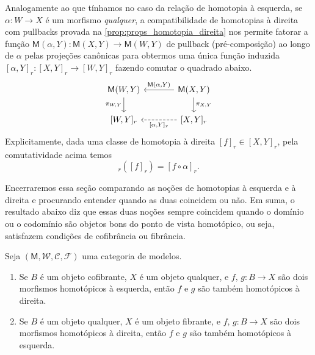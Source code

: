 Analogamente ao que tínhamos no caso da relação de homotopia à esquerda, se $\alpha: W \to X$ é um morfismo \emph{qualquer}, a compatibilidade de homotopias à direita com pullbacks provada na \cref{prop:props_homotopia_direita} nos permite fatorar a função $\mathsf{M}(\alpha,Y): \mathsf{M}(X,Y) \to \mathsf{M}(W,Y)$ de pullback (pré-composição) ao longo de $\alpha$ pelas projeções canônicas para obtermos uma única função induzida $[\alpha,Y]_{r}: [X,Y]_{r} \to [W,Y]_{r}$ fazendo comutar o quadrado abaixo.
\begin{displaymath}
  \begin{tikzcd}[column sep=1.25cm]
    \mathsf{M}(W,Y)
    \arrow[d, "{\pi_{W,Y}}" swap]
    & \mathsf{M}(X,Y)
    \arrow[d, "{\pi_{X,Y}}"]
    \arrow[l, "{\mathsf{M}(\alpha,Y)}" swap]
    \\ {[W,Y]_{r}}
    & {[X,Y]_{r}}
    \arrow[l, dashed, "{[\alpha,Y]_{r}}"]
  \end{tikzcd}
\end{displaymath}
Explicitamente, dada uma classe de homotopia à direita $[f]_{r} \in [X,Y]_{r}$, pela comutatividade acima temos
\begin{displaymath}
  [\alpha,Y]_{r}([f]_{r}) = [f \circ \alpha]_{r}.
\end{displaymath}

Encerraremos essa seção comparando as noções de homotopias à esquerda e à direita e procurando entender quando as duas coincidem ou não.
Em suma, o resultado abaixo diz que essas duas noções sempre coincidem quando o domínio ou o codomínio são objetos bons do ponto de vista homotópico, ou seja, satisfazem condições de cofibrância ou fibrância.

\begin{prop}\label{prop:comparando_homotopia_esquerda_direita}
  Seja $(\mathsf{M},\mathcal{W},\mathcal{C},\mathcal{F})$ uma categoria de modelos.
  \begin{enumerate}
  \item Se $B$ é um objeto cofibrante, $X$ é um objeto qualquer, e $f,\,g: B \to X$ são dois morfismos homotópicos à esquerda, então $f$ e $g$ são também homotópicos à direita.
    
  \item Se $B$ é um objeto qualquer, $X$ é um objeto fibrante, e $f,\,g: B \to X$ são dois morfismos homotópicos à direita, então $f$ e $g$ são também homotópicos à esquerda.
  \end{enumerate}
\end{prop}

